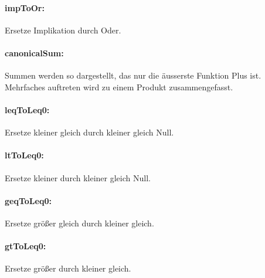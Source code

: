 \documentclass[a4paper]{article}
\begin{document}
\paragraph{impToOr:} Ersetze Implikation durch Oder.
\begin{mathpar}
\end{mathpar}
\paragraph{canonicalSum:} Summen werden so dargestellt, das nur die äusserste Funktion Plus ist. Mehrfaches auftreten wird zu einem Produkt zusammengefasst.
\begin{mathpar}
\end{mathpar}
\paragraph{leqToLeq0:} Ersetze kleiner gleich durch kleiner gleich Null.
\begin{mathpar}
\end{mathpar}
\paragraph{ltToLeq0:} Ersetze kleiner durch kleiner gleich Null.
\begin{mathpar}
\end{mathpar}
\paragraph{geqToLeq0:} Ersetze größer gleich durch kleiner gleich.
\begin{mathpar}
\end{mathpar}
\paragraph{gtToLeq0:} Ersetze größer durch kleiner gleich.
\begin{mathpar}
\end{mathpar}
\end{document}
